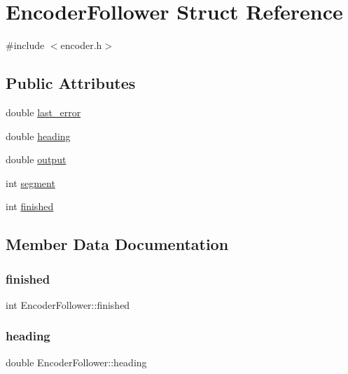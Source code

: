 \hypertarget{structEncoderFollower}{}\section{Encoder\+Follower Struct Reference}
\label{structEncoderFollower}


{\ttfamily \#include $<$encoder.\+h$>$}

\subsection*{Public Attributes}
\begin{DoxyCompactItemize}
\item 
double \mbox{\hyperlink{structEncoderFollower_ac0e3830d4438eedeb7075557177a9fb4}{last\+\_\+error}}
\item 
double \mbox{\hyperlink{structEncoderFollower_aaee4bf7bddf36a42a82695822f2a69f0}{heading}}
\item 
double \mbox{\hyperlink{structEncoderFollower_ada75b37fe615fb41e460a6bc356069fa}{output}}
\item 
int \mbox{\hyperlink{structEncoderFollower_a04da7958d8cb5556ebfe0e39bbc4e1a5}{segment}}
\item 
int \mbox{\hyperlink{structEncoderFollower_a0ab0235e385070a055e174afc2cc8cb6}{finished}}
\end{DoxyCompactItemize}


\subsection{Member Data Documentation}
\mbox{\label{structEncoderFollower_a0ab0235e385070a055e174afc2cc8cb6}} 
\subsubsection{\texorpdfstring{finished}{finished}}
{\footnotesize\ttfamily int Encoder\+Follower\+::finished}

\mbox{\label{structEncoderFollower_aaee4bf7bddf36a42a82695822f2a69f0}} 
\subsubsection{\texorpdfstring{heading}{heading}}
{\footnotesize\ttfamily double Encoder\+Follower\+::heading}

